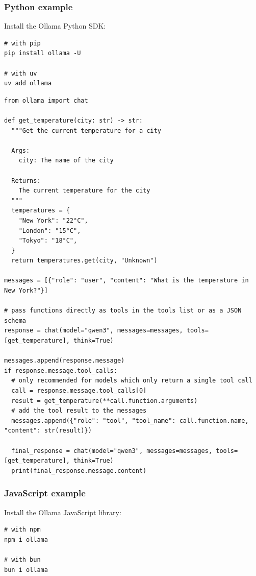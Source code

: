 \documentclass[12pt,UTF8]{ctexbook}
\begin{document}
\subsubsection{Python example}

Install the Ollama Python SDK:

\begin{verbatim}
# with pip
pip install ollama -U

# with uv
uv add ollama
\end{verbatim}

\begin{verbatim}
from ollama import chat

def get_temperature(city: str) -> str:
  """Get the current temperature for a city
  
  Args:
    city: The name of the city

  Returns:
    The current temperature for the city
  """
  temperatures = {
    "New York": "22°C",
    "London": "15°C",
    "Tokyo": "18°C",
  }
  return temperatures.get(city, "Unknown")

messages = [{"role": "user", "content": "What is the temperature in New York?"}]

# pass functions directly as tools in the tools list or as a JSON schema
response = chat(model="qwen3", messages=messages, tools=[get_temperature], think=True)

messages.append(response.message)
if response.message.tool_calls:
  # only recommended for models which only return a single tool call
  call = response.message.tool_calls[0]
  result = get_temperature(**call.function.arguments)
  # add the tool result to the messages
  messages.append({"role": "tool", "tool_name": call.function.name, "content": str(result)})

  final_response = chat(model="qwen3", messages=messages, tools=[get_temperature], think=True)
  print(final_response.message.content)
\end{verbatim}

\subsubsection{JavaScript example}

Install the Ollama JavaScript library:

\begin{verbatim}
# with npm
npm i ollama

# with bun
bun i ollama
\end{verbatim}
\end{document}
